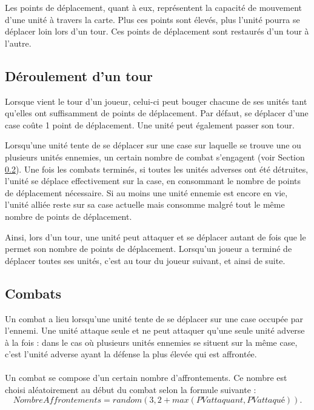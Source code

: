 	Les points de déplacement, quant à eux, représentent la capacité de mouvement d'une unité à travers la carte. Plus ces points sont élevés, plus l'unité pourra se déplacer loin lors d'un tour. Ces points de déplacement sont restaurés d'un tour à l'autre.
	
	\subsection{Déroulement d'un tour}
	Lorsque vient le tour d'un joueur, celui-ci peut bouger chacune de ses unités tant qu'elles ont suffisamment de points de déplacement. Par défaut, se déplacer d'une case coûte 1 point de déplacement. Une unité peut également passer son tour.
	
	Lorsqu'une unité tente de se déplacer sur une case sur laquelle se trouve une ou plusieurs unités ennemies, un certain nombre de combat s'engagent (voir Section \ref{subsec:combats}). Une fois les combats terminés, si toutes les unités adverses ont été détruites, l'unité se déplace effectivement sur la case, en consommant le nombre de points de déplacement nécessaire. Si au moins une unité ennemie est encore en vie, l'unité alliée reste sur sa case actuelle mais consomme malgré tout le même nombre de points de déplacement.
	
	Ainsi, lors d'un tour, une unité peut attaquer et se déplacer autant de fois que le permet son nombre de points de déplacement. Lorsqu'un joueur a terminé de déplacer toutes ses unités, c'est au tour du joueur suivant, et ainsi de suite.

	\subsection{Combats}
	\label{subsec:combats}
	Un combat a lieu lorsqu'une unité tente de se déplacer sur une case occupée par l'ennemi. Une unité attaque seule et ne peut attaquer qu'une seule unité adverse à la fois : dans le cas où plusieurs unités ennemies se situent sur la même case, c'est l'unité adverse ayant la défense la plus élevée qui est affrontée.
	
	\paragraph{}
	Un combat se compose d’un certain nombre d’affrontements. Ce nombre est choisi aléatoirement au début du combat selon la formule suivante : \[ NombreAffrontements = random(3,2+max(PVattaquant, PVattaqué)). \]
	
